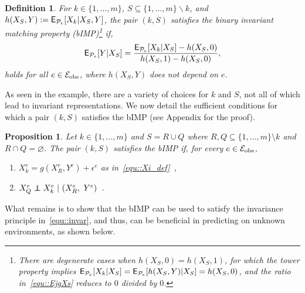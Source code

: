 \documentclass[conference,letterpaper]{IEEEtran}
\newtheorem{definition}{Definition}
\newtheorem{proposition}{Proposition}
\newcommand\independent{\protect\mathpalette{\protect\independenT}{\perp}}
\def\independenT#1#2{\mathrel{\rlap{$#1#2$}\mkern2mu{#1#2}}}
\begin{document}
\begin{definition}
    For $k\in\{1,\dots,m\}$, $S \subseteq \{1,\dots,m\}\backslash k$, and $h(X_S,Y) := \operatorname{\sf E}_{\mathcal{P}_e}[X_k|X_S,Y]$, the pair $(k,S)$ satisfies the binary invariant matching property (bIMP)\footnote{There are \emph{degenerate} cases when $h(X_S,0) = h(X_S,1)$, for which the tower property implies $\operatorname{\sf E}_{\mathcal{P}_e}[X_k|X_S] = \operatorname{\sf E}_{\mathcal{P}_e}[h(X_S,Y)|X_S] = h(X_S,0)$, and the ratio in~\eqref{equ::EjgXs} reduces to $0$ divided by $0$.} if,
    \begin{equation}\label{equ::EjgXs}
    \E_{\Pc_e}[Y|X_S] = \frac{\E_{\Pc_e}[X_k|X_S] - h(X_S,0)}{h(X_S,1) - h(X_S,0)}, 
    \end{equation}
    holds for all $e\in\mathcal{E}_{\text{obs}}$, where $h(X_S,Y)$ does not depend on $e$.
\end{definition}




As seen in the example, there are a variety of choices for $k$ and $S$, not all of which lead to invariant representations. We now detail the sufficient conditions for which a pair $(k,S)$ satisfies the bIMP (see Appendix for the proof).

\begin{proposition} \label{prop::suff}
    Let $ k \in \{1,\ldots,m\}$ and $S = R \cup Q$ where $R,Q \subseteq \{1,\ldots,m\} \setminus k$ and $R \cap Q = \varnothing$. The pair $(k,S)$ satisfies the bIMP if, for every $e\in\mathcal{E}_{\text{obs}}$, 
    \begin{enumerate}
        \item $X^e_k = g(X^e_R,Y^e) + \epsilon^e$ as in~\eqref{equ::Xi_def}\ ,
        \item  $X^e_Q \independent X^e_k \ |\  (X^e_R,\ Y^e)$\ .
    \end{enumerate}
\end{proposition}

What remains is to show that the bIMP can be used to satisfy the invariance principle in~\eqref{equ::invar}, and thus, can be beneficial in predicting on unknown environments, as shown below.
\end{document}
